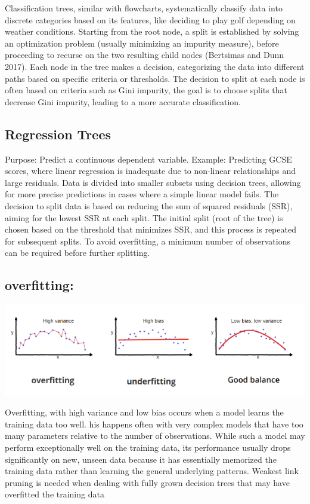 \documentclass[
  letterpaper,
  DIV=11,
  numbers=noendperiod]{scrreprt}
\begin{document}
Classification trees, similar with flowcharts, systematically classify
data into discrete categories based on its features, like deciding to
play golf depending on weather conditions. Starting from the root node,
a split is established by solving an optimization problem (usually
minimizing an impurity measure), before proceeding to recurse on the two
resulting child nodes (Bertsimas and Dunn 2017). Each node in the tree
makes a decision, categorizing the data into different paths based on
specific criteria or thresholds. The decision to split at each node is
often based on criteria such as Gini impurity, the goal is to choose
splits that decrease Gini impurity, leading to a more accurate
classification.

\subsection{Regression Trees}\label{regression-trees}

Purpose: Predict a continuous dependent variable. Example: Predicting
GCSE scores, where linear regression is inadequate due to non-linear
relationships and large residuals. Data is divided into smaller subsets
using decision trees, allowing for more precise predictions in cases
where a simple linear model fails. The decision to split data is based
on reducing the sum of squared residuals (SSR), aiming for the lowest
SSR at each split. The initial split (root of the tree) is chosen based
on the threshold that minimizes SSR, and this process is repeated for
subsequent splits. To avoid overfitting, a minimum number of
observations can be required before further splitting.

\subsection{overfitting:}\label{overfitting}

\includegraphics{overfitting.png}

Overfitting, with high variance and low bias occurs when a model learns
the training data too well. his happens often with very complex models
that have too many parameters relative to the number of observations.
While such a model may perform exceptionally well on the training data,
its performance usually drops significantly on new, unseen data because
it has essentially memorized the training data rather than learning the
general underlying patterns. Weakest link pruning is needed when dealing
with fully grown decision trees that may have overfitted the training
data
\end{document}
